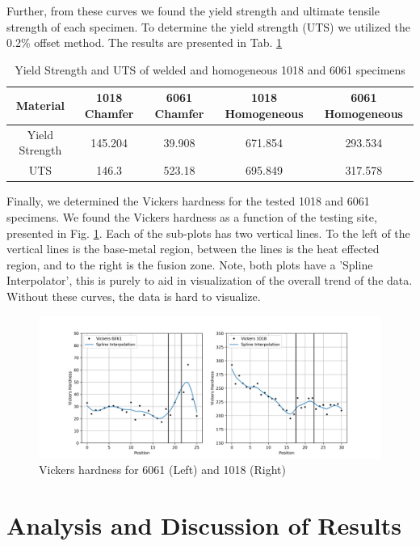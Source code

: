 \documentclass{article}
\begin{document}
\newpage
Further, from these curves we found the yield strength and ultimate tensile strength of each specimen. To determine the yield strength (UTS) we utilized the 0.2\% offset method. The results are presented in Tab. \ref{tab:q2lab7}

\begin{table}[!hp!]
    \centering
    \caption{Yield Strength and UTS of welded and homogeneous 1018 and 6061 specimens}
    \begin{tabular}{|c|c|c|c|c|}
        \toprule
        \bottomrule
        Material & 1018 Chamfer & 6061 Chamfer & 1018 Homogeneous & 6061 Homogeneous \\
        \toprule
        \bottomrule
        Yield Strength & 145.204 & 39.908 & 671.854 & 293.534 \\
        \hline
        UTS & 146.3 & 523.18 & 695.849 & 317.578 \\
        \hline
    \end{tabular}
    \label{tab:q2lab7}
\end{table}

Finally, we determined the Vickers hardness for the tested 1018 and 6061 specimens. We found the Vickers hardness as a function of the testing site, presented in Fig. \ref{fig:q4}. Each of the sub-plots has two vertical lines. To the left of the vertical lines is the base-metal region, between the lines is the heat effected region, and to the right is the fusion zone. Note, both plots have a 'Spline Interpolator', this is purely to aid in visualization of the overall trend of the data. Without these curves, the data is hard to visualize.  

\begin{figure}[!hp!]
    \centering
    \includegraphics[width=\linewidth]{plots/q4.png}
    \caption{Vickers hardness for 6061 (Left) and 1018 (Right)}
    \label{fig:q4}
\end{figure}

\newpage
\section{Analysis and Discussion of Results}
\end{document}
